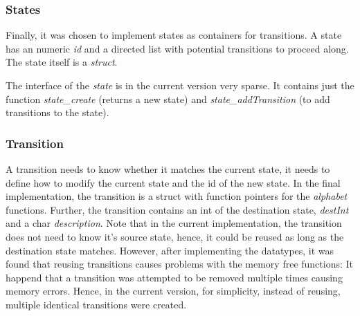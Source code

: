 \documentclass[a4paper,11pt,twoside]{article}
\begin{document}
\subsubsection{States}

Finally, it was chosen to implement states as containers for
transitions. A state has an numeric \textit{id} and a directed list
with potential transitions to proceed along. The state itself is a
\textit{struct}.




The interface of the \textit{state} is in the current version very
sparse. It contains just the function \textit{state\_create} (returns a
new state) and \textit{state\_addTransition} (to add transitions to the
state). 


\subsubsection{Transition}
A transition needs to know whether it matches the current
state, it needs to define how to modify the current state and the id
of the new state. In the final implementation, the transition is a
struct with function pointers for the \textit{alphabet}
functions. Further, the transition contains an int of the destination
state, \textit{destInt} and a char \textit{description}. Note that in
the current implementation, the transition does not need to know it's
source state, hence, it could be reused as long as the destination state
matches. However, after implementing the datatypes, it was found that
reusing transitions causes problems with the memory free functions: It
happend that a transition was attempted to be removed multiple
times causing memory errors. Hence, in the current version, for
simplicity, instead of reusing, multiple identical transitions were created.  
  
\end{document}
